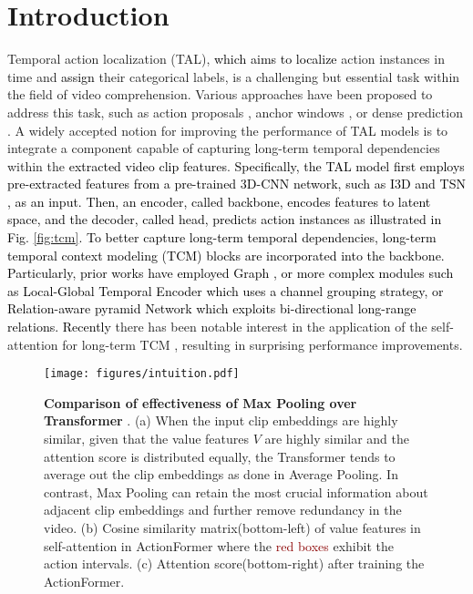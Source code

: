 \documentclass[10pt,twocolumn,letterpaper]{article}
\newcommand{\ky}[1]{\textcolor{black}{{#1}}}
\newcommand{\tuan}[1]{\textcolor{black}{{#1}}}
\begin{document}
\section{Introduction}
Temporal action localization (TAL), \ky{which aims to localize} action instances in time and \ky{assign} their categorical labels, {is a challenging but essential task} within the field of video comprehension. 
Various approaches have been proposed to address this task, such as action proposals \cite{lin2019bmn},  anchor windows \cite{long2019gaussian}, or dense prediction \cite{lin2021learning}. A widely accepted notion for improving the performance of TAL models is to integrate a component capable of capturing long-term temporal dependencies within the \ky{extracted video clip features}\cite{qing2021temporal, gao2020accurate, zhang2022actionformer, he2022glformer, liu2022end, nawhal2021activity, tan2021relaxed, wang2021temporal}. 
\tuan{Specifically,} \ky{the TAL model first employs pre-extracted features from a pre-trained 3D-CNN network, such as I3D \cite{carreira2017quo} and TSN \cite{wang2016temporal}, as an input. Then, an encoder, called backbone, encodes features to latent space, and the decoder, called head, predicts action instances as illustrated in Fig. \ref{fig:tcm}. To better capture long-term temporal dependencies, long-term temporal context modeling (TCM) blocks are incorporated into the backbone. Particularly, prior works \cite{xu2020g, zhao2021video} have employed Graph \cite{kipf2016semi}, or more complex modules such as Local-Global Temporal Encoder \cite{qing2021temporal} which uses a channel grouping strategy, or Relation-aware pyramid Network \cite{gao2020accurate} which exploits bi-directional long-range relations.}
\ky{Recently} there has been notable interest in the application of the self-attention \cite{vaswani2017attention} for long-term TCM \cite{zhang2022actionformer, liu2022end, zhao2021actionness, kang2022htnet}, resulting in surprising performance improvements.

\begin{figure}[hbt!]
\begin{center}
\texttt{[image: figures/intuition.pdf]}
\end{center}
\caption{\textbf{Comparison of effectiveness of Max Pooling over Transformer} \cite{vaswani2017attention}. 
(a) When the input clip embeddings are highly similar, given that the value features $V$ are highly similar and the attention score is distributed equally, the Transformer tends to average out the clip embeddings as done in Average Pooling. 
In contrast, Max Pooling can retain the most crucial information about adjacent clip embeddings and further remove redundancy in the video.
(b) Cosine similarity matrix(bottom-left) of value features in self-attention in ActionFormer \cite{zhang2022actionformer} where the \textcolor{darkred}{red boxes} exhibit the action intervals.
(c) Attention score(bottom-right) after training the ActionFormer\cite{zhang2022actionformer}. }
\label{fig:similarity}
\end{figure}
\end{document}
